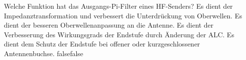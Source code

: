     {Welche Funktion hat das Ausgangs-Pi-Filter eines HF-Senders?}
    {Es dient der Impedanztransformation und verbessert die Unterdrückung von Oberwellen.}
    {Es dient der besseren Oberwellenanpassung an die Antenne.}
    {Es dient der Verbesserung des Wirkungsgrads der Endstufe durch Änderung der ALC.}
    {Es dient dem Schutz der Endstufe bei offener oder kurzgeschlossener Antennenbuchse.}
    {false}{false}